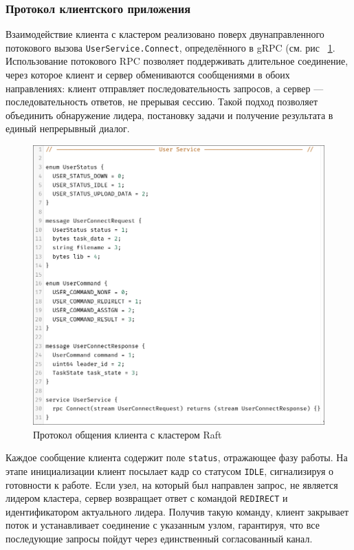 \subsubsection{Протокол клиентского приложения}

Взаимодействие клиента с кластером реализовано поверх двунаправленного
потокового вызова \texttt{UserService.Connect}, определённого в gRPC (см. рис
~\ref{fig:user_proto}. Использование потокового RPC позволяет поддерживать
длительное соединение, через которое клиент и сервер обмениваются сообщениями в
обоих направлениях: клиент отправляет последовательность запросов, а сервер —
последовательность ответов, не прерывая сессию. Такой подход позволяет
объединить обнаружение лидера, постановку задачи и получение результата в
единый непрерывный диалог.

\begin{figure}
  \centering
  \includegraphics[scale=0.4]{inc/user-proto.png}
  \caption{Протокол общения клиента с кластером Raft}
  \label{fig:user_proto}
\end{figure}

Каждое сообщение клиента содержит поле \texttt{status}, отражающее фазу работы.
На этапе инициализации клиент посылает кадр со статусом \texttt{IDLE},
сигнализируя о готовности к работе. Если узел, на который был направлен запрос,
не является лидером кластера, сервер возвращает ответ с командой \texttt{REDIRECT}
и идентификатором актуального лидера. Получив такую команду, клиент закрывает
поток и устанавливает соединение с указанным узлом, гарантируя, что все
последующие запросы пойдут через единственный согласованный канал.

